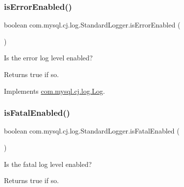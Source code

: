 \mbox{\label{classcom_1_1mysql_1_1cj_1_1log_1_1_standard_logger_ab2e1961de9eba2577b779cb970abc000}} 
\subsubsection{\texorpdfstring{is\+Error\+Enabled()}{isErrorEnabled()}}
{\footnotesize\ttfamily boolean com.\+mysql.\+cj.\+log.\+Standard\+Logger.\+is\+Error\+Enabled (\begin{DoxyParamCaption}{ }\end{DoxyParamCaption})}

Is the \textquotesingle{}error\textquotesingle{} log level enabled?

\begin{DoxyReturn}{Returns}
true if so. 
\end{DoxyReturn}


Implements \mbox{\hyperlink{interfacecom_1_1mysql_1_1cj_1_1log_1_1_log_abda4b698026fdb26c74b211b521628c9}{com.\+mysql.\+cj.\+log.\+Log}}.

\mbox{\label{classcom_1_1mysql_1_1cj_1_1log_1_1_standard_logger_a622ab5114bddae2c0893a08e53c66cff}} 
\subsubsection{\texorpdfstring{is\+Fatal\+Enabled()}{isFatalEnabled()}}
{\footnotesize\ttfamily boolean com.\+mysql.\+cj.\+log.\+Standard\+Logger.\+is\+Fatal\+Enabled (\begin{DoxyParamCaption}{ }\end{DoxyParamCaption})}

Is the \textquotesingle{}fatal\textquotesingle{} log level enabled?

\begin{DoxyReturn}{Returns}
true if so. 
\end{DoxyReturn}


